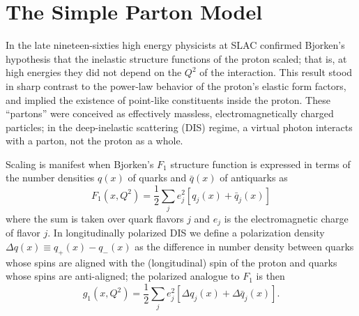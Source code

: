 \section{The Simple Parton Model}


In the late nineteen-sixties high energy physicists at SLAC confirmed Bjorken's
hypothesis that the inelastic structure functions of the proton scaled; that is,
at high energies they did not depend on the $Q^2$ of the interaction. This
result stood in sharp contrast to the power-law behavior of the proton's elastic
form factors, and implied the existence of point-like constituents inside the
proton. These ``partons'' were conceived as effectively massless,
electromagnetically charged particles; in the deep-inelastic scattering
(DIS) regime, a virtual photon interacts with a parton, not the proton as a
whole.

Scaling is manifest when Bjorken's $F_1$ structure function is expressed in terms of the number densities $q(x)$ of quarks and $\bar q(x)$ of antiquarks as
%
\begin{equation}
  F_1(x, Q^2) = \frac{1}{2}\sum_{j}{e_j^2[q_j(x) + \bar{q}_j(x)]}
\end{equation}
%
where the sum is taken over quark flavors $j$ and $e_j$ is the electromagnetic charge of flavor $j$.  In longitudinally polarized DIS we define a polarization density $\Delta  q(x) \equiv q_+(x) - q_-(x)$ as the difference in number density between quarks whose spins are aligned with the (longitudinal) spin of the proton and quarks whose spins are anti-aligned; the polarized analogue to $F_1$ is then
%
\begin{equation}
  g_1(x, Q^2) = \frac{1}{2}\sum_{j}{e_j^2[\Delta q_j(x) + \Delta \bar{q}_j(x)]}.
\end{equation}

